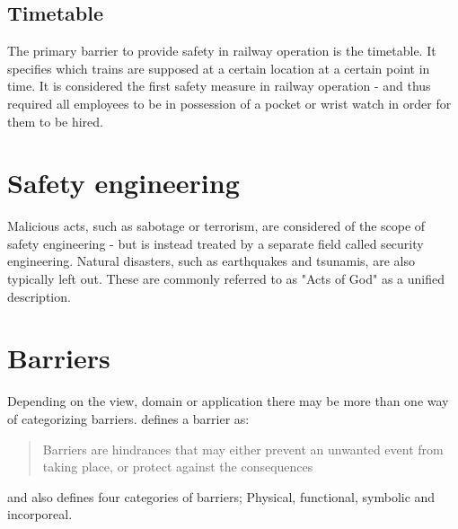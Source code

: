 \subsection{Timetable}
The primary barrier to provide safety in railway operation is the timetable. It specifies which trains are supposed at a certain location at a certain point in time. It is considered the first safety measure in railway operation - and thus required all employees to be in possession of a pocket or wrist watch in order for them to be hired.




\section{Safety engineering}
Malicious acts, such as sabotage or terrorism, are considered of the scope of safety engineering - but is instead treated by a separate field called security engineering. Natural disasters, such as earthquakes and tsunamis, are also typically left out. These are commonly referred to as "Acts of God" as a unified description.

\section{Barriers}
\label{sec:barriers}
Depending on the view, domain or application there may be more than one way of categorizing barriers.\cite{hollnagel2004barriers} defines a barrier as:
\begin{quote}
Barriers are hindrances that may either prevent an unwanted event from taking place, or protect against the consequences
\end{quote}
and also defines four categories of barriers; Physical, functional, symbolic and incorporeal.

